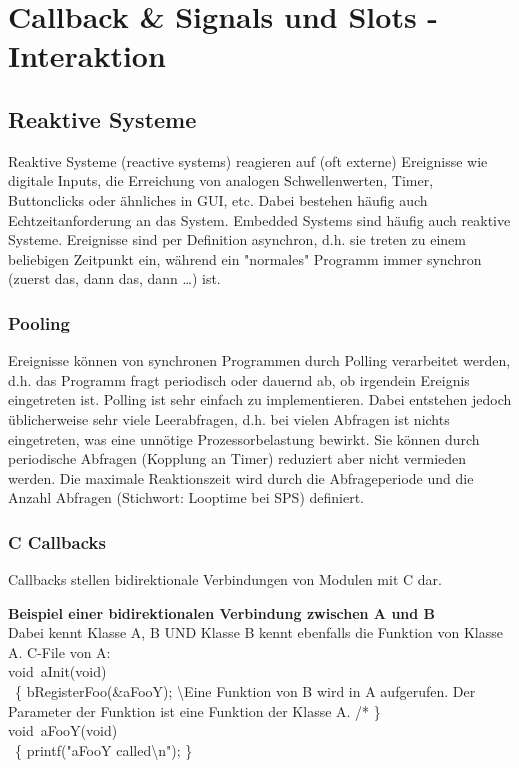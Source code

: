 \chapter{Callback \& Signals und Slots - Interaktion}

\section{Reaktive Systeme}

Reaktive Systeme (reactive systems) reagieren auf (oft externe) Ereignisse wie digitale Inputs, die Erreichung von analogen Schwellenwerten, Timer, Buttonclicks oder ähnliches in GUI, etc. Dabei bestehen häufig auch Echtzeitanforderung an das System. Embedded Systems sind häufig auch reaktive Systeme. 
Ereignisse sind per Definition asynchron, d.h. sie treten zu einem beliebigen Zeitpunkt ein, während ein "normales" Programm immer synchron (zuerst das, dann das, dann …) ist. 

\subsection{Pooling}
Ereignisse können von synchronen Programmen durch Polling verarbeitet werden, d.h. das 
Programm fragt periodisch oder dauernd ab, ob irgendein Ereignis eingetreten ist. Polling ist sehr einfach zu implementieren. 
Dabei entstehen jedoch üblicherweise sehr viele Leerabfragen, d.h. bei vielen Abfragen ist nichts eingetreten, was eine unnötige Prozessorbelastung bewirkt. Sie können durch periodische Abfragen (Kopplung an Timer) reduziert aber nicht vermieden werden.
Die maximale Reaktionszeit wird durch die Abfrageperiode und die Anzahl Abfragen (Stichwort: Looptime bei SPS) definiert. 

\subsection{C Callbacks}
Callbacks stellen bidirektionale Verbindungen von Modulen mit C dar. 

\textbf{Beispiel einer bidirektionalen Verbindung zwischen A und B} \\
 Dabei kennt Klasse A, B UND Klasse B kennt ebenfalls die Funktion von Klasse A.
C-File von A: \\
void aInit(void) \\ \{
	bRegisterFoo(\&aFooY);  \textbackslash*Eine Funktion von B wird in A aufgerufen. Der Parameter der Funktion ist eine Funktion der Klasse A. /* 
\}\\
void aFooY(void) \\ \{ 
	printf("aFooY called\textbackslash n");
\}

